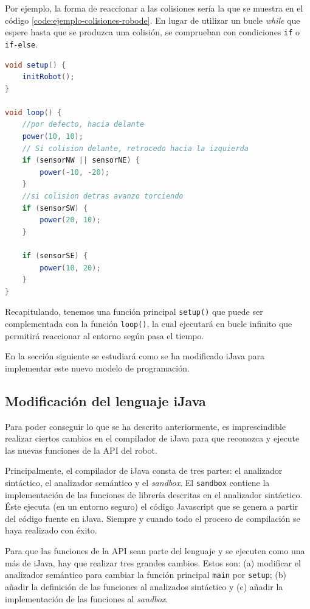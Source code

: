 Por ejemplo, la forma de reaccionar a las colisiones sería la que se muestra en el código \ref{code:ejemplo-colisiones-robode}. En lugar de utilizar un bucle \emph{while} que espere hasta que se produzca una colisión, se comprueban con condiciones \texttt{if} o \texttt{if-else}.

\begin{lstlisting}[language={Java},label={code:ejemplo-colisiones-robode}, caption={Ejemplo de buenas prácticas en el uso de la API del simulador.}]
void setup() {
    initRobot();
}

void loop() {
	//por defecto, hacia delante
    power(10, 10);
	// Si colision delante, retrocedo hacia la izquierda
    if (sensorNW || sensorNE) {
        power(-10, -20);
    }
  	//si colision detras avanzo torciendo
    if (sensorSW) {
        power(20, 10);
    }
    
    if (sensorSE) {
        power(10, 20);
    }
}
\end{lstlisting}

Recapitulando, tenemos una función principal \texttt{setup()} que puede ser complementada con la función \texttt{loop()}, la cual ejecutará en bucle infinito que permitirá reaccionar al entorno según pasa el tiempo.

En la sección siguiente se estudiará como se ha modificado iJava para implementar este nuevo modelo de programación.

\subsection{Modificación del lenguaje iJava}
\label{sec:modificacion-ijava}

Para poder conseguir lo que se ha descrito anteriormente, es imprescindible realizar ciertos cambios en el compilador de iJava para que reconozca y ejecute las nuevas funciones de la API del robot.

Principalmente, el compilador de iJava consta de tres partes: el analizador sintáctico, el analizador semántico y el \emph{sandbox}. El \texttt{sandbox} contiene la implementación de las funciones de librería descritas en el analizador sintáctico. Éste ejecuta (en un entorno seguro) el código Javascript que se genera a partir del código fuente en iJava. Siempre y cuando todo el proceso de compilación se haya realizado con éxito. 

Para que las funciones de la API sean parte del lenguaje y se ejecuten como una más de iJava, hay que realizar tres grandes cambios. Estos son: (a) modificar el analizador semántico para cambiar la función principal \texttt{main} por \texttt{setup}; (b) añadir la definición de las funciones al analizados sintáctico y (c) añadir la implementación de las funciones al \emph{sandbox}.

